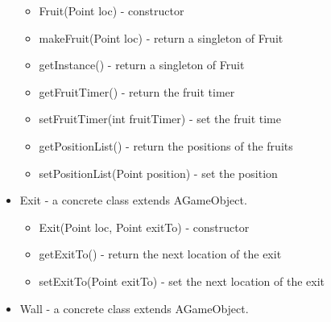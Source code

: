 \documentclass[letterpaper, 11pt]{article}
\begin{document}
\begin{itemize}
\begin{itemize}
  \item Fruit(Point loc) - constructor
  \item makeFruit(Point loc) - return a singleton of Fruit
  \item getInstance() - return a singleton of Fruit
  \item getFruitTimer() - return the fruit timer
  \item setFruitTimer(int fruitTimer) - set the fruit time
  \item getPositionList() - return the positions of the fruits
  \item setPositionList(Point position) - set the position
  \end{itemize}
  \item Exit - a concrete class extends AGameObject.
  \begin{itemize}
  \item Exit(Point loc, Point exitTo) - constructor
  \item getExitTo() - return the next location of the exit
  \item setExitTo(Point exitTo) - set the next location of the exit
  \end{itemize}
  \item Wall - a concrete class extends AGameObject.
  \fi
    
\end{itemize}
\end{document}
